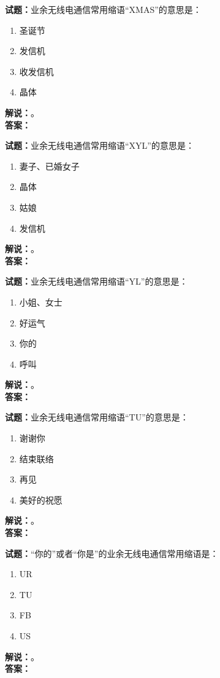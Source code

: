 \documentclass{ctexbook}
\begin{document}
\noindent\textbf{试题：}业余无线电通信常用缩语“XMAS”的意思是：
\begin{enumerate}[leftmargin=3em]
\item 圣诞节
\item 发信机
\item 收发信机
\item 晶体
\end{enumerate}
\noindent\textbf{解说：}\textbf{}。\\\noindent\textbf{答案：}

\bigskip




\noindent\textbf{试题：}业余无线电通信常用缩语“XYL”的意思是：
\begin{enumerate}[leftmargin=3em]
\item 妻子、已婚女子
\item 晶体
\item 姑娘
\item 发信机
\end{enumerate}
\noindent\textbf{解说：}\textbf{}。\\\noindent\textbf{答案：}

\bigskip




\noindent\textbf{试题：}业余无线电通信常用缩语“YL”的意思是：
\begin{enumerate}[leftmargin=3em]
\item 小姐、女士
\item 好运气
\item 你的
\item 呼叫
\end{enumerate}
\noindent\textbf{解说：}\textbf{}。\\\noindent\textbf{答案：}

\bigskip




\noindent\textbf{试题：}业余无线电通信常用缩语“TU”的意思是：
\begin{enumerate}[leftmargin=3em]
\item 谢谢你
\item 结束联络
\item 再见
\item 美好的祝愿
\end{enumerate}
\noindent\textbf{解说：}\textbf{}。\\\noindent\textbf{答案：}

\bigskip




\noindent\textbf{试题：}“你的”或者“你是”的业余无线电通信常用缩语是：
\begin{enumerate}[leftmargin=3em]
\item UR
\item TU
\item FB
\item US
\end{enumerate}
\noindent\textbf{解说：}\textbf{}。\\\noindent\textbf{答案：}
\end{document}
